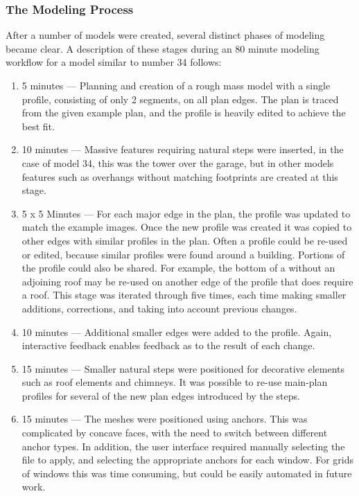 
\subsubsection{The Modeling Process}
\label{s:the_modeling_process}



After a number of models were created, several distinct phases of modeling became clear. A description of these stages during an 80 minute modeling workflow for a model similar to number 34 follows:

\begin{enumerate}

\item{\label{tmp_first}5 minutes --- Planning and creation of a rough mass model with a single profile, consisting of only 2 segments, on all plan edges. The plan is traced from the given example plan, and the profile is heavily edited to achieve the best fit.}
\item{10 minutes --- Massive features requiring natural steps were inserted, in the case of model 34, this was the tower over the garage, but in other models features such as overhangs without matching footprints are created at this stage. }
\item {\label{tmp_third}5 x 5  Minutes --- For each major edge in the plan, the profile was updated to match the example images. Once the new profile was created it was copied to other edges with similar profiles in the plan. Often a profile could be re-used or edited, because similar profiles were found around a building. Portions of the profile could also be shared. For example, the bottom of a \facade{} without an adjoining roof may be re-used on another edge of the profile that does require a roof. This stage was iterated through five times, each time making smaller additions, corrections, and taking into account previous changes.}
\item{10 minutes --- Additional smaller edges were added to the profile. Again, interactive feedback enables feedback as to the result of each change.}
\item {\label{tmp_five}15 minutes --- Smaller natural steps were positioned for decorative elements such as roof elements and chimneys. It was possible to re-use main-plan profiles for several of the new plan edges introduced by the steps.}
\item{\label{tmp_last}15 minutes --- The meshes were positioned using anchors. This was complicated by concave faces, with the need to switch between different anchor types. In addition, the user interface required manually selecting the file to apply, and selecting the appropriate anchors for each window. For grids of windows this was time consuming, but could be easily automated in future work.}

\end{enumerate}

